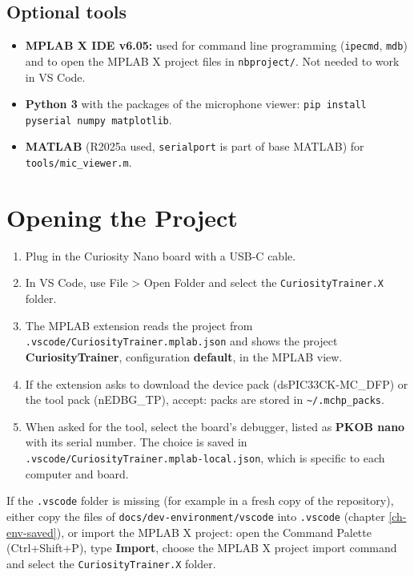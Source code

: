 \documentclass[
  11pt,
  letterpaper,
  oneside,
  DIV=13,               %
  parskip=half,          %
  headings=normal,
  chapterprefix=false,
  toc=listof,
  numbers=noenddot,
]{scrbook}
\begin{document}
\section{Optional tools}
\begin{itemize}
\item \textbf{MPLAB X IDE v6.05:} used for command line programming (\texttt{ipecmd}, \texttt{mdb}) and to open the MPLAB X project files in \texttt{nbproject/\allowbreak{}}. Not needed to work in VS Code.
\item \textbf{Python 3} with the packages of the microphone viewer: \texttt{pip install pyserial numpy matplotlib}.
\item \textbf{MATLAB} (R2025a used, \texttt{serialport} is part of base MATLAB) for \texttt{tools/\allowbreak{}mic\_\allowbreak{}viewer.\allowbreak{}m}.
\end{itemize}

\chapter{Opening the Project}\label{ch-env-open}
\begin{enumerate}
\item Plug in the Curiosity Nano board with a USB-C cable.
\item In VS Code, use File > Open Folder and select the \texttt{CuriosityTrainer.\allowbreak{}X} folder.
\item The MPLAB extension reads the project from \texttt{.\allowbreak{}vscode/\allowbreak{}CuriosityTrainer.\allowbreak{}mplab.\allowbreak{}json} and shows the project \textbf{CuriosityTrainer}, configuration \textbf{default}, in the MPLAB view.
\item If the extension asks to download the device pack (dsPIC33CK-MC\_DFP) or the tool pack (nEDBG\_TP), accept: packs are stored in \texttt{\textasciitilde{}/\allowbreak{}.\allowbreak{}mchp\_\allowbreak{}packs}.
\item When asked for the tool, select the board's debugger, listed as \textbf{PKOB nano} with its serial number. The choice is saved in \texttt{.\allowbreak{}vscode/\allowbreak{}CuriosityTrainer.\allowbreak{}mplab-\allowbreak{}local.\allowbreak{}json}, which is specific to each computer and board.
\end{enumerate}

If the \texttt{.\allowbreak{}vscode} folder is missing (for example in a fresh copy of the repository), either copy the files of \texttt{docs/\allowbreak{}dev-\allowbreak{}environment/\allowbreak{}vscode} into \texttt{.\allowbreak{}vscode} (chapter \ref{ch-env-saved}), or import the MPLAB X project: open the Command Palette (Ctrl+Shift+P), type \textbf{Import}, choose the MPLAB X project import command and select the \texttt{CuriosityTrainer.\allowbreak{}X} folder.
\end{document}
